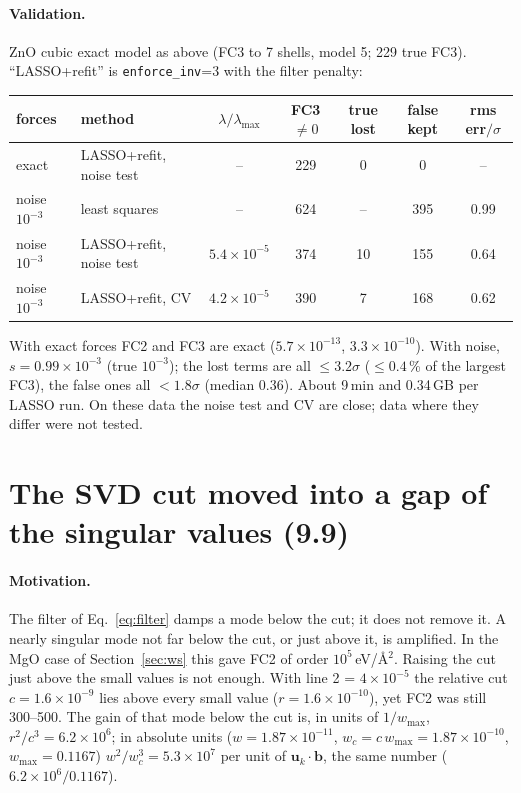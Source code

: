 \documentclass[11pt,a4paper]{article}
\newcommand{\bb}{\mathbf b}
\newcommand{\bu}{\mathbf u}
\newcommand{\code}[1]{\texttt{#1}}
\begin{document}
\paragraph{Validation.} ZnO cubic exact model as above (FC3 to 7 shells, model 5; 229 true FC3).
``LASSO+refit'' is \code{enforce\_inv}=3 with the filter penalty:
\begin{center}
\small
\begin{tabular}{@{}llccccc@{}}
\toprule
forces & method & $\lambda/\lambda_{\max}$ & FC3 $\neq0$ & true lost & false kept & rms err$/\sigma$\\
\midrule
exact & LASSO+refit, noise test & -- & 229 & 0 & 0 & --\\
noise $10^{-3}$ & least squares & -- & 624 & -- & 395 & 0.99\\
noise $10^{-3}$ & LASSO+refit, noise test & $5.4\times10^{-5}$ & 374 & 10 & 155 & 0.64\\
noise $10^{-3}$ & LASSO+refit, CV & $4.2\times10^{-5}$ & 390 & 7 & 168 & 0.62\\
\bottomrule
\end{tabular}
\end{center}
With exact forces FC2 and FC3 are exact ($5.7\times10^{-13}$, $3.3\times10^{-10}$). With noise, $s=0.99\times10^{-3}$
(true $10^{-3}$); the lost terms are all $\le3.2\sigma$ ($\le0.4$\,\% of the largest FC3), the false ones all
$<1.8\sigma$ (median 0.36). About 9\,min and 0.34\,GB per LASSO run. On these data the noise test and CV are close;
data where they differ were not tested.

\section{The SVD cut moved into a gap of the singular values (9.9)}\label{sec:gap}
\paragraph{Motivation.} The filter of Eq.~\eqref{eq:filter} damps a mode below the cut; it does not remove
it. A nearly singular mode not far below the cut, or just above it, is amplified. In the MgO case of
Section~\ref{sec:ws} this gave FC2 of order $10^5$\,eV/\AA$^2$. Raising the cut just above the small values is
not enough. With line 2 = $4\times10^{-5}$ the relative cut $c=1.6\times10^{-9}$ lies above every small value
($r=1.6\times10^{-10}$), yet FC2 was still 300--500. The gain of that mode below the cut is, in units of
$1/w_{\max}$, $r^2/c^3=6.2\times10^6$; in absolute units ($w=1.87\times10^{-11}$, $w_c=c\,w_{\max}=1.87\times10^{-10}$,
$w_{\max}=0.1167$) $w^2/w_c^3=5.3\times10^7$ per unit of $\bu_k\cdot\bb$, the same number
($6.2\times10^6/0.1167$).
\end{document}
